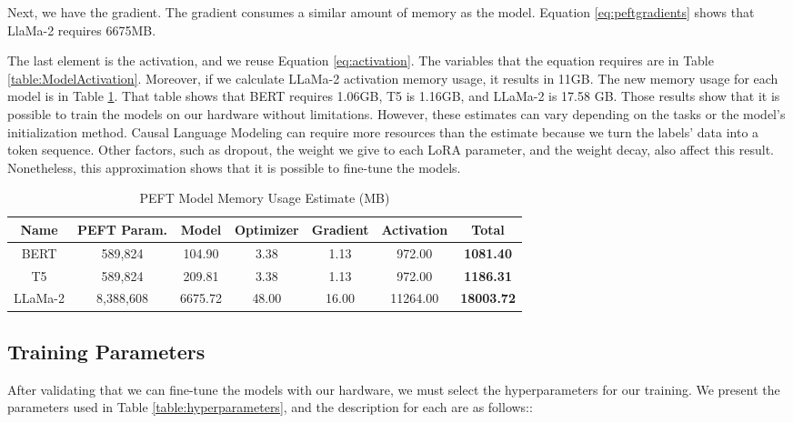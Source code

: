 Next, we have the gradient. The gradient consumes a similar amount of memory as the model. Equation \ref{eq:peftgradients} shows that LlaMa-2 requires 6675MB.


The last element is the activation, and we reuse Equation \ref{eq:activation}. The variables that the equation requires are in Table \ref{table:ModelActivation}. Moreover, if we calculate LLaMa-2 activation memory usage, it results in 11GB. The new memory usage for each model is in Table \ref{table:PeftMemoryUsage}. That table shows that BERT requires 1.06GB, T5 is 1.16GB, and LLaMa-2 is 17.58 GB. Those results show that it is possible to train the models on our hardware without limitations. However, these estimates can vary depending on the tasks or the model's initialization method. Causal Language Modeling can require more resources than the estimate because we turn the labels' data into a token sequence. Other factors, such as dropout, the weight we give to each LoRA parameter, and the weight decay, also affect this result. Nonetheless, this approximation shows that it is possible to fine-tune the models.

\begin{table}[H]
	\centering
	\caption{PEFT Model Memory Usage Estimate (MB)}
	\begin{tabular}{||c | c | c | c | c | c | c||} 
		\hline
		\textbf{Name} & \textbf{PEFT Param.} & \textbf{Model} & \textbf{Optimizer} & \textbf{Gradient} & \textbf{Activation} & \textbf{Total} \\ [1ex] 
		\hline
		BERT & 589,824 & 104.90 & 3.38 & 1.13 & 972.00 & \textbf{1081.40} \\ [1ex]
		\hline
		T5 & 589,824 & 209.81 & 3.38 & 1.13 & 972.00 & \textbf{1186.31}  \\[1ex]
		\hline
		LLaMa-2 & 8,388,608 & 6675.72 & 48.00 & 16.00 & 11264.00 & \textbf{18003.72}  \\[1ex]
		\hline
	\end{tabular}
	\label{table:PeftMemoryUsage}
\end{table}


\subsection{Training Parameters}
After validating that we can fine-tune the models with our hardware, we must select the hyperparameters for our training. We present the parameters used in Table \ref{table:hyperparameters}, and the description for each are as follows::

